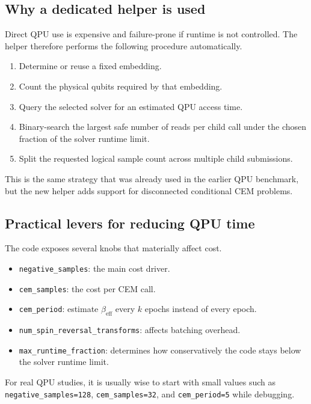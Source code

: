 \documentclass[11pt]{article}
\begin{document}
\subsection{Why a dedicated helper is used}

Direct QPU use is expensive and failure-prone if runtime is not controlled. The
helper therefore performs the following procedure automatically.

\begin{enumerate}
  \item Determine or reuse a fixed embedding.
  \item Count the physical qubits required by that embedding.
  \item Query the selected solver for an estimated QPU access time.
  \item Binary-search the largest safe number of reads per child call under the
  chosen fraction of the solver runtime limit.
  \item Split the requested logical sample count across multiple child
  submissions.
\end{enumerate}

This is the same strategy that was already used in the earlier QPU benchmark,
but the new helper adds support for disconnected conditional CEM problems.

\subsection{Practical levers for reducing QPU time}

The code exposes several knobs that materially affect cost.

\begin{itemize}
  \item \texttt{negative\_samples}: the main cost driver.
  \item \texttt{cem\_samples}: the cost per CEM call.
  \item \texttt{cem\_period}: estimate $\beta_{\mathrm{eff}}$ every $k$ epochs
  instead of every epoch.
  \item \texttt{num\_spin\_reversal\_transforms}: affects batching overhead.
  \item \texttt{max\_runtime\_fraction}: determines how conservatively the code
  stays below the solver runtime limit.
\end{itemize}

For real QPU studies, it is usually wise to start with small values such as
\texttt{negative\_samples=128}, \texttt{cem\_samples=32}, and
\texttt{cem\_period=5} while debugging.
\end{document}

